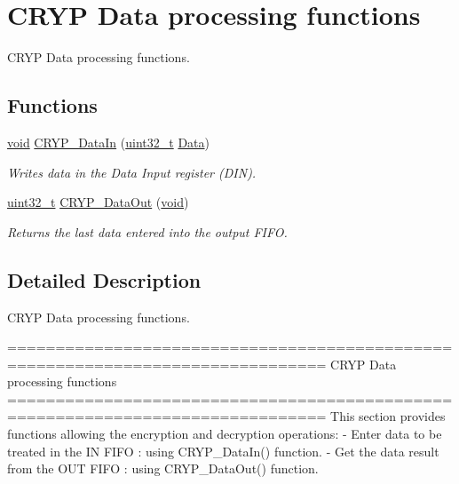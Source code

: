 \hypertarget{group___c_r_y_p___group2}{\section{C\-R\-Y\-P Data processing functions}
\label{group___c_r_y_p___group2}
}


C\-R\-Y\-P Data processing functions.  


\subsection*{Functions}
\begin{DoxyCompactItemize}
\item 
\hyperlink{group___n_a_m_e_ga18028b8badbf1ea7e704ccac3c488e82}{void} \hyperlink{group___c_r_y_p___group2_ga16dc76244318d464357ee6ff208bf9a4}{C\-R\-Y\-P\-\_\-\-Data\-In} (\hyperlink{stdint_8h_a435d1572bf3f880d55459d9805097f62}{uint32\-\_\-t} \hyperlink{group___copter_control_b_l_ga6f3335509cc4943e20df66f72483910c}{Data})
\begin{DoxyCompactList}\small\item\em Writes data in the Data Input register (D\-I\-N). \end{DoxyCompactList}\item 
\hyperlink{stdint_8h_a435d1572bf3f880d55459d9805097f62}{uint32\-\_\-t} \hyperlink{group___c_r_y_p___group2_gacbe5fcf4c7e4919192376fa615588b54}{C\-R\-Y\-P\-\_\-\-Data\-Out} (\hyperlink{group___n_a_m_e_ga18028b8badbf1ea7e704ccac3c488e82}{void})
\begin{DoxyCompactList}\small\item\em Returns the last data entered into the output F\-I\-F\-O. \end{DoxyCompactList}\end{DoxyCompactItemize}


\subsection{Detailed Description}
C\-R\-Y\-P Data processing functions. \begin{DoxyVerb} ===============================================================================
                      CRYP Data processing functions
 ===============================================================================  
  This section provides functions allowing the encryption and decryption 
  operations: 
  - Enter data to be treated in the IN FIFO : using CRYP_DataIn() function.
  - Get the data result from the OUT FIFO : using CRYP_DataOut() function.\end{DoxyVerb}
 

